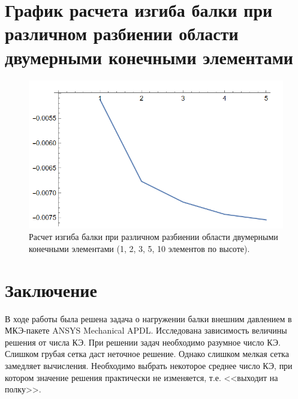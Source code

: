 \documentclass[12pt,a4paper]{article}
\begin{document}
    \section { График расчета изгиба балки при различном разбиении области двумерными
    	конечными элементами }
    \begin{figure}[h]
    	\centering
    	\includegraphics[width=1\textwidth]{graph.PNG}
    	\caption{Расчет изгиба балки при различном разбиении области двумерными
    		конечными элементами (1, 2, 3, 5, 10 элементов по высоте).}
    \end{figure}

\section {Заключение}

В ходе работы была решена задача о нагружении балки внешним давлением в МКЭ-пакете ANSYS Mechanical APDL. Исследована зависимость величины решения от числа КЭ. 
При решении задач необходимо разумное число КЭ. Слишком грубая сетка даст неточное решение. Однако слишком мелкая сетка замедляет вычисления. Необходимо выбрать некоторое среднее число КЭ, при котором значение решения практически не изменяется, т.е. <<выходит на полку>>.
\end{document}
